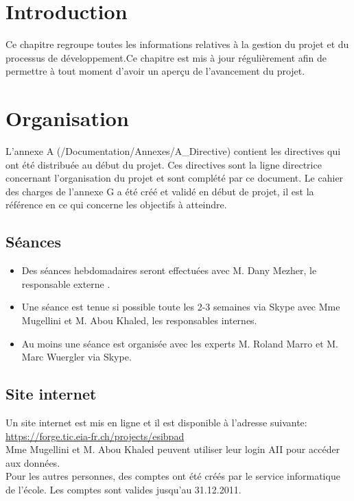 	\section{Introduction}
	Ce chapitre regroupe toutes les informations relatives à la gestion du projet et du processus de développement.Ce chapitre est mis à jour régulièrement afin de permettre à tout moment d'avoir un aperçu de l'avancement du projet.

\section{Organisation}
	L'annexe A (/Documentation/Annexes/A\_Directive) contient les directives qui ont été distribuée au début du projet. Ces directives sont la ligne directrice concernant l'organisation du projet et sont complété par ce document.
	Le cahier des charges de l'annexe G a été créé et validé  en début de projet, il est la référence en ce qui concerne les objectifs à atteindre. 
	
	\subsection{Séances}
	\begin{itemize}
		\item Des séances hebdomadaires seront effectuées avec M. Dany Mezher, le responsable externe .
		\item Une séance est tenue si possible toute les 2-3 semaines via Skype avec Mme Mugellini et M. Abou Khaled, les responsables internes.
		\item Au moins une séance est organisée avec les experts M. Roland Marro et M. Marc Wuergler via Skype.
	\end{itemize}
	\subsection{Site internet}
		Un site internet est mis en ligne et il est disponible à l'adresse suivante: \url{https://forge.tic.eia-fr.ch/projects/esibpad} \\
		Mme Mugellini et M. Abou Khaled peuvent utiliser leur login AII pour accéder aux données.\\
		Pour les autres personnes, des comptes ont été créés par le service informatique de l'école. Les comptes sont valides jusqu'au 31.12.2011. \\[1cm]
		
